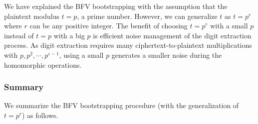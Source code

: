 $ $

 We have explained the BFV bootstrapping with the assumption that the plaintext modulus $t = p$, a prime number. However, we can generalize $t$ as $t=p^r$ where $r$ can be any positive integer. The benefit of choosing $t = p^r$ with a small $p$ instead of $t = p$ with a big $p$ is efficient noise management of the digit extraction process. As digit extraction requires many ciphertext-to-plaintext multiplications with $p, p^2, \cdots, p^{\varepsilon-1}$, using a small $p$ generates a smaller noise during the homomorphic operations.  


\subsubsection{Summary}
\label{subsubsec:bfv-bootstrapping-summary}

We summarize the BFV bootstrapping procedure (with the generalization of $t = p^r$) as follows. 

